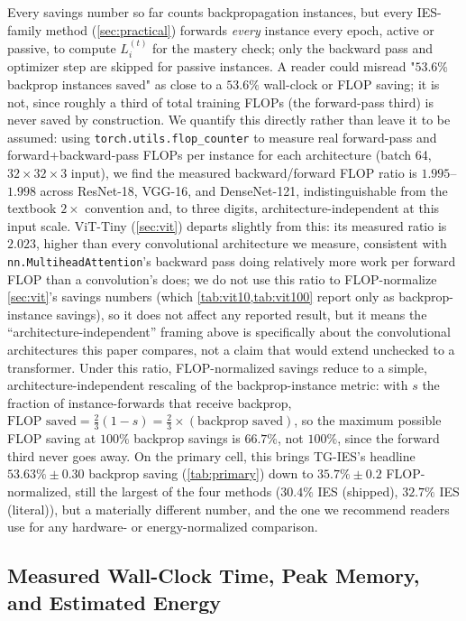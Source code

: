 \documentclass{article}
\theoremstyle{plain}
\theoremstyle{definition}
\theoremstyle{remark}
\begin{document}
Every savings number so far counts backpropagation instances, but every IES-family method (\cref{sec:practical}) forwards \emph{every} instance every epoch, active or passive, to compute $L_i^{(t)}$ for the mastery check; only the backward pass and optimizer step are skipped for passive instances. A reader could misread "$53.6\%$ backprop instances saved" as close to a $53.6\%$ wall-clock or FLOP saving; it is not, since roughly a third of total training FLOPs (the forward-pass third) is never saved by construction. We quantify this directly rather than leave it to be assumed: using \texttt{torch.utils.flop\_counter} to measure real forward-pass and forward+backward-pass FLOPs per instance for each architecture (batch 64, $32\times32\times3$ input), we find the measured backward/forward FLOP ratio is $1.995$--$1.998$ across ResNet-18, VGG-16, and DenseNet-121, indistinguishable from the textbook $2\times$ convention and, to three digits, architecture-independent at this input scale. ViT-Tiny (\cref{sec:vit}) departs slightly from this: its measured ratio is $2.023$, higher than every convolutional architecture we measure, consistent with \texttt{nn.MultiheadAttention}'s backward pass doing relatively more work per forward FLOP than a convolution's does; we do not use this ratio to FLOP-normalize \cref{sec:vit}'s savings numbers (which \cref{tab:vit10,tab:vit100} report only as backprop-instance savings), so it does not affect any reported result, but it means the ``architecture-independent'' framing above is specifically about the convolutional architectures this paper compares, not a claim that would extend unchecked to a transformer. Under this ratio, FLOP-normalized savings reduce to a simple, architecture-independent rescaling of the backprop-instance metric: with $s$ the fraction of instance-forwards that receive backprop, $\text{FLOP saved} = \tfrac23(1-s) = \tfrac23\times(\text{backprop saved})$, so the maximum possible FLOP saving at $100\%$ backprop savings is $66.7\%$, not $100\%$, since the forward third never goes away. On the primary cell, this brings TG-IES's headline $53.63\%\pm0.30$ backprop saving (\cref{tab:primary}) down to $35.7\%\pm0.2$ FLOP-normalized, still the largest of the four methods ($30.4\%$ IES (shipped), $32.7\%$ IES (literal)), but a materially different number, and the one we recommend readers use for any hardware- or energy-normalized comparison.

\subsection{Measured Wall-Clock Time, Peak Memory, and Estimated Energy}
\label{sec:efficiency}
\end{document}
